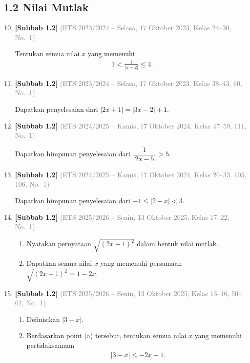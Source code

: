 \documentclass[10pt,openany,a4paper]{article}
\theoremstyle{definition}
\theoremstyle{definition}
\theoremstyle{plain}
\begin{document}
\subsection*{1.2 \quad Nilai Mutlak}
\begin{enumerate}
\setcounter{enumi}{9}
    \item \textbf{[Subbab 1.2]} {\footnotesize\textcolor{gray}{(ETS 2023/2024 -- Selasa, 17 Oktober 2023, Kelas 24--30, No.~1)}}\par
    Tentukan semua nilai $x$ yang memenuhi
    \begin{align*}
        1<\frac{1}{|x-2|}\leq 4.
    \end{align*}

    \item \textbf{[Subbab 1.2]} {\footnotesize\textcolor{gray}{(ETS 2023/2024 -- Selasa, 17 Oktober 2023, Kelas 38--43, 60, No.~1)}}\par
    Dapatkan penyelesaian dari $|2x+1|=|3x-2|+1$.

    \item \textbf{[Subbab 1.2]} {\footnotesize\textcolor{gray}{(ETS 2024/2025 -- Kamis, 17 Oktober 2024, Kelas 47--59, 111, No.~1)}}\par
    Dapatkan himpunan penyelesaian dari $\dfrac{1}{|2x-5|}>5$.

    \item \textbf{[Subbab 1.2]} {\footnotesize\textcolor{gray}{(ETS 2024/2025 -- Kamis, 17 Oktober 2024, Kelas 20--33, 105, 106, No.~1)}}\par
    Dapatkan himpunan penyelesaian dari $-1\leq |2-x|<3$.

    \item \textbf{[Subbab 1.2]} {\footnotesize\textcolor{gray}{(ETS 2025/2026 -- Senin, 13 Oktober 2025, Kelas 17--22, No.~1)}}\par
    \begin{enumerate}
        \item Nyatakan pernyataan $\sqrt{(2x-1)^2}$ dalam bentuk nilai mutlak.
        \item Dapatkan semua nilai $x$ yang memenuhi persamaan $\sqrt{(2x-1)^2}=1-2x$.
    \end{enumerate}

    \item \textbf{[Subbab 1.2]} {\footnotesize\textcolor{gray}{(ETS 2025/2026 -- Senin, 13 Oktober 2025, Kelas 13--16, 50--61, No.~1)}}\par
    \begin{enumerate}
        \item Definisikan $|3-x|$.
        \item Berdasarkan point (a) tersebut, tentukan semua nilai $x$ yang memenuhi pertidaksamaan
        \begin{align*}
            |3-x|\leq -2x+1.
        \end{align*}
    \end{enumerate}


\end{enumerate}
\end{document}
